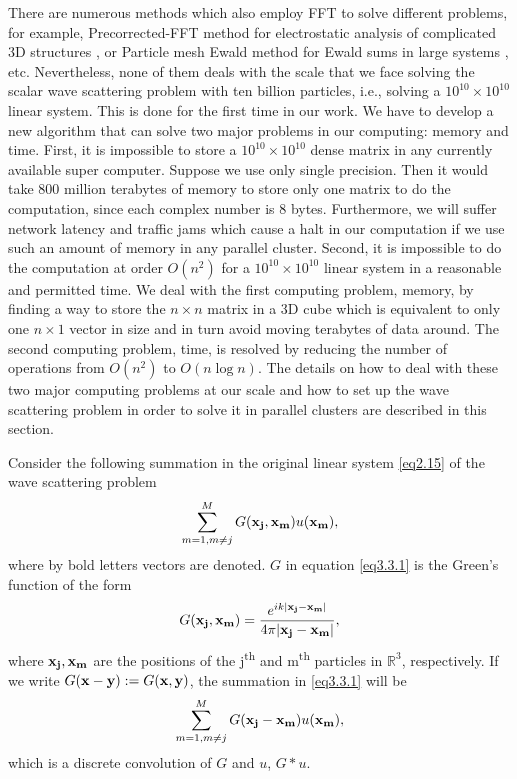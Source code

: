 \documentclass{wap}
\newcommand{\be}{\begin{equation}}
\newcommand{\ee}{\end{equation}}
\newcommand{\RRR}{\mathbb{R}^3}
\begin{document}
There are numerous methods which also employ FFT to solve different problems, for example, Precorrected-FFT method for electrostatic analysis of complicated 3D structures \cite{PhilWhite}, or Particle mesh Ewald method for Ewald sums in large systems \cite{DardenYorkPedersen}, etc. Nevertheless, none of them deals with the scale that we face solving the scalar wave scattering problem with ten billion particles, i.e., solving a $10^{10} \times 10^{10}$ linear system. This is done for the first time in our work.  We have to develop a new algorithm that can solve two major problems in our computing: memory and time. First, it is impossible to store a $10^{10} \times 10^{10}$ dense matrix in any currently available super computer. Suppose we use only single precision. Then it would take 800 million terabytes of memory to store only one matrix to do the computation, since each complex number is 8 bytes. Furthermore, we will suffer network latency and traffic jams which cause a halt in our computation if we use such an amount of memory in any parallel cluster. Second, it is impossible to do the computation at order $O(n^2)$ for a $10^{10} \times 10^{10}$ linear system in a reasonable and permitted time. We deal with the first computing problem, memory, by finding a way to store the $n \times n$ matrix in a 3D cube which is equivalent to only one $n \times 1$ vector in size and in turn avoid moving terabytes of data around. The second computing problem, time, is resolved by reducing the number of operations from $O(n^2)$ to $O(n\log n)$. The details on how to deal with these two major computing problems at our scale and how to set up the wave scattering problem in order to solve it in parallel clusters are described in this section.

Consider the following summation in the original linear system \eqref{eq2.15} of the wave scattering problem
\be \label{eq3.3.1}
	\sum_{m=1, m \ne j}^M G(\bold{x_j},\bold{x_m})u(\bold{x_m}),
\ee
where by bold letters vectors are denoted. $G$ in equation \eqref{eq3.3.1} is the Green's function of the form
\be \label{eq3.3.2}
	G(\bold{x_j},\bold{x_m})=\frac{e^{ik|\bold{x_j}-\bold{x_m}|}}{4\pi|\bold{x_j}-\bold{x_m}|},
\ee
where $\bold{x_j}, \bold{x_m}$ are the positions of the j\textsuperscript{th} and m\textsuperscript{th} particles in $\RRR$, respectively. If we write $G(\bold{x}-\bold{y}):=G(\bold{x},\bold{y})$, the summation in \eqref{eq3.3.1} will be
\be \label{eq3.3.4}
	\sum_{m=1, m \ne j}^M G(\bold{x_j}-\bold{x_m})u(\bold{x_m}),
\ee
which is a discrete convolution of $G$ and $u$, $G*u$.
\end{document}
